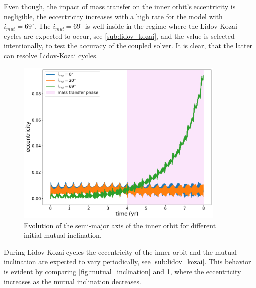 Even though, the impact of mass transfer on the inner orbit's eccentricity is negligible, the eccentricity increases with a high rate for the model with $i_{mut}=69^{\circ}$. The $i_{mut}=69^{\circ}$ is well inside in the regime where the Lidov-Kozai cycles are expected to occur, see \cref{sub:lidov_kozai}, and the value is selected intentionally, to test the accuracy of the coupled solver. It is clear, that the latter can resolve Lidov-Kozai cycles.
\begin{figure}[!htb]
    \centering
    \includegraphics[width=0.9\textwidth]{Thesis/graphs/inclination_case/inclination_inner_ecc.pdf}
    \caption{Evolution of the semi-major axis of the inner orbit for different initial mutual inclination.}
    \label{fig:inclination_inner_ecc}
\end{figure}

During Lidov-Kozai cycles the eccentricity of the inner orbit and the mutual inclination are expected to vary periodically, see \cref{sub:lidov_kozai}. This behavior is evident by comparing \cref{fig:mutual_inclination} and \cref{fig:inclination_inner_ecc}, where the eccentricity increases as the mutual inclination decreases.

 